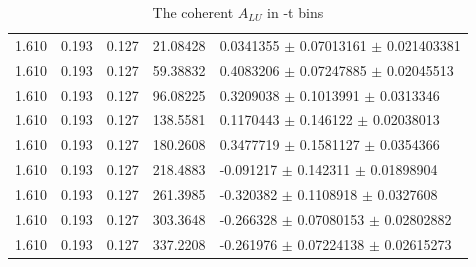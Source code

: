 \begin{table}[!h]
\begin{center}
\begin{tabular}{||l|l|l|l|l||}
           1.610 & 0.193 & 0.127 &  21.08428   & 0.0341355   $\pm$  0.07013161   $\pm$   0.021403381     \\
           1.610 & 0.193 & 0.127 &  59.38832   & 0.4083206   $\pm$  0.07247885   $\pm$   0.02045513      \\
           1.610 & 0.193 & 0.127 &  96.08225   & 0.3209038   $\pm$  0.1013991    $\pm$   0.0313346       \\
           1.610 & 0.193 & 0.127 &  138.5581   & 0.1170443   $\pm$  0.146122     $\pm$   0.02038013      \\
           1.610 & 0.193 & 0.127 &  180.2608   & 0.3477719   $\pm$  0.1581127    $\pm$   0.0354366       \\
           1.610 & 0.193 & 0.127 &  218.4883   & -0.091217   $\pm$  0.142311     $\pm$   0.01898904      \\
           1.610 & 0.193 & 0.127 &  261.3985   & -0.320382   $\pm$  0.1108918    $\pm$   0.0327608       \\
           1.610 & 0.193 & 0.127 &  303.3648   & -0.266328   $\pm$  0.07080153   $\pm$   0.02802882      \\
           1.610 & 0.193 & 0.127 &  337.2208   & -0.261976   $\pm$  0.07224138   $\pm$   0.02615273      \\
         \hline
         \hline
      \end{tabular}
      \caption{The coherent $A_{LU}$ in -t bins}
      \label{table:Coh_t_BSA}
   \end{center}
\end{table}


